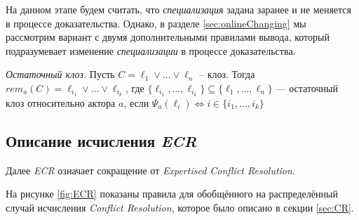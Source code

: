 На данном этапе будем считать, что \emph{специализация} задана заранее и не меняется в процессе доказательства. Однако, в разделе \ref{sec:onlineChanging} мы рассмотрим вариант с двумя дополнительными правилами вывода, который подразумевает изменение \emph{специализации} в процессе доказательства.

\begin{definition}
	\emph{Остаточный клоз.} Пусть $C = \ell_1 \vee \ldots \vee \ell_n$ -- клоз. Тогда $rem_a(C) = \ell_{i_1} \vee \ldots \vee \ell_{i_k}$, где $\{\ell_{i_1}, \ldots, \ell_{i_k}\} \subseteq \{\ell_1, \ldots, \ell_n\}$ --- остаточный клоз относительно актора $a$, если $\Psi_a(\ell_i) \iff i \in \{i_1, \ldots, i_k\}$
\end{definition}


\subsection{Описание исчисления \emph{ECR}}

Далее \emph{ECR} означает сокращение от \emph{Expertised Conflict Resolution}.

На рисунке \ref{fig:ECR} показаны правила для обобщённого на распределённый случай исчисления \emph{Conflict Resolution}, которое было описано в секции \ref{sec:CR}. \par

